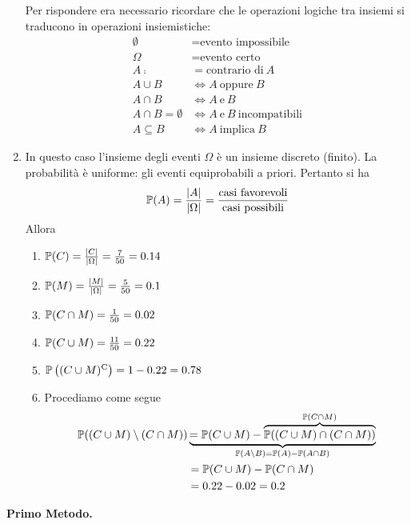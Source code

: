 \begin{enumerate}
	Per rispondere era necessario ricordare che le operazioni logiche tra insiemi si traducono in operazioni insiemistiche:
	\begin{align*}
		\emptyset  & =\text{evento impossibile}\\
		\Omega  & =\text{evento certo}\\
		A\comp & =\text{contrario di} \ A\\
		A\cup B & \iff A\ \text{oppure} \ B\\
		A\cap B & \iff A\ \text{e} \ B\\
		A\cap B=\emptyset  & \iff A\ \text{e} \ B\ \text{incompatibili}\\
		A\subseteq B & \iff A\ \text{implica} \ B
	\end{align*}
	\item In questo caso l'insieme degli eventi $\Omega $ è un insieme discreto (finito). La probabilità è uniforme: gli eventi equiprobabili a priori. Pertanto si ha
	\begin{equation*}
		\mathbb{P}( A) =\frac{| A| }{| \Omega | } =\frac{\text{casi favorevoli}}{\text{casi possibili}}
	\end{equation*}
	Allora
	\begin{enumerate}
		\item $\mathbb{P}( C) =\frac{| C| }{| \Omega | } =\frac{7}{50} =0.14$
		\item $\mathbb{P}( M) =\frac{| M| }{| \Omega | } =\frac{5}{50} =0.1$
		\item $\mathbb{P}( C\cap M) =\frac{1}{50} =0.02$
		\item $\mathbb{P}( C\cup M) =\frac{11}{50} =0.22$
		\item $\mathbb{P}\left(( C\cup M)^{\mathrm{C}}\right) =1-0.22=0.78$
		\item Procediamo come segue
		\begin{align*}
			\mathbb{P}(( C\cup M) \setminus ( C\cap M)) & \underbrace{=\mathbb{P}( C\cup M) -\overbrace{\mathbb{P}(( C\cup M) \cap ( C\cap M))}^{\mathbb{P}( C\cap M)}}_{\mathbb{P}( A\setminus B) =\mathbb{P}( A) -\mathbb{P}( A\cap B)}\\
			 & =\mathbb{P}( C\cup M) -\mathbb{P}( C\cap M)\\
			 & =0.22-0.02=0.2
		\end{align*}
	\end{enumerate}
\end{enumerate}

\Soluzione

\textbf{Primo Metodo.}

